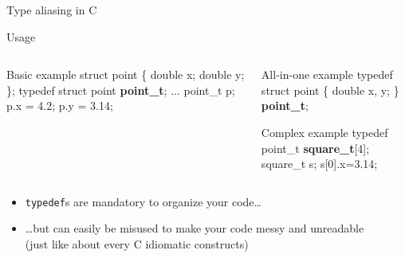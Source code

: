 \begin{Coupe}
\begin{frame}{Type aliasing in C}
\begin{block}{Usage}
\begin{columns}
\begin{column}{.45\linewidth}
      \begin{boitecode}{Basic example}
struct point \{
  double x;
  double y;
\};
\alert{typedef struct point \textbf{\textrm{point\_t}};}
...
point_t p;
p.x = 4.2;
p.y = 3.14;
      \end{boitecode}
    \end{column}
    \begin{column}{.45\linewidth}\vspace{-.7\baselineskip}
      \begin{boitecode}{All-in-one example}
\alert{typedef struct point \{
  double x, y;
\} \textbf{\textrm{point\_t}};}
      \end{boitecode}\vspace{-.8\baselineskip}

      \begin{boitecode}{Complex example}
\alert{typedef point_t \textbf{\textrm{square\_t}}[4];}
square_t s;     s[0].x=3.14;
      \end{boitecode}
    \end{column}
  \end{columns}
  \end{block}\vspace{-.7\baselineskip}
  \begin{itemize}
  \item \texttt{typedef}s are mandatory to organize your code\ldots
  \item \ldots but can easily be misused to make your code messy and
    unreadable\\
    {\small (just like about every C idiomatic constructs)}
  \end{itemize}
\end{frame}

\end{Coupe}
